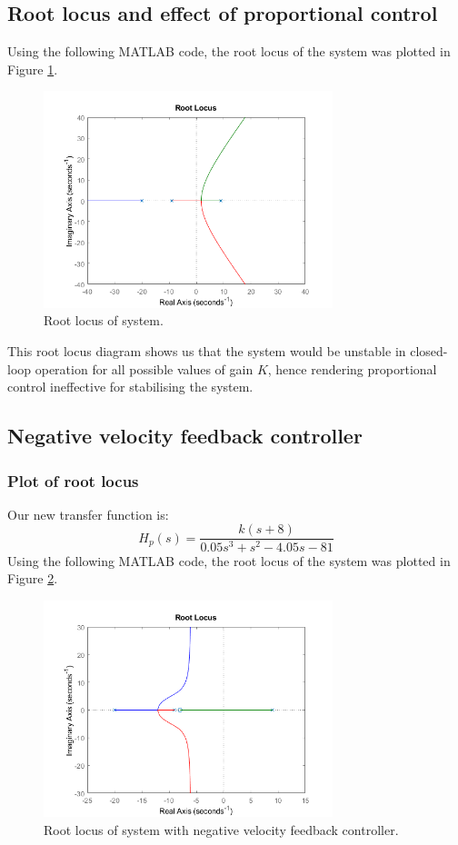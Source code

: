 \documentclass[11pt]{article}
\numberwithin{equation}{section}
\begin{document}
\subsection{Root locus and effect of proportional control}
Using the following MATLAB code, the root locus of the system was plotted in Figure \ref{q3b}.

\begin{figure}[H]
    \centering
    \includegraphics[width = 0.75\textwidth]{./img/q3b.png}
    \caption{Root locus of system.}
    \label{q3b}
\end{figure}
This root locus diagram shows us that the system would be unstable in closed-loop operation for all possible values of gain $K$, hence rendering proportional control ineffective for stabilising the system. 
\subsection{Negative velocity feedback controller}
\subsubsection{Plot of root locus}
Our new transfer function is:
\begin{equation}
    H_p(s) = \frac{k\left(s+8\right)}{0.05s^3 + s^2 -4.05s - 81}
\end{equation}
Using the following MATLAB code, the root locus of the system was plotted in Figure \ref{q3ci}.

\begin{figure}[H]
    \centering
    \includegraphics[width = 0.75\textwidth]{./img/q3ci.png}
    \caption{Root locus of system with negative velocity feedback controller.}
    \label{q3ci}
\end{figure}
\end{document}
